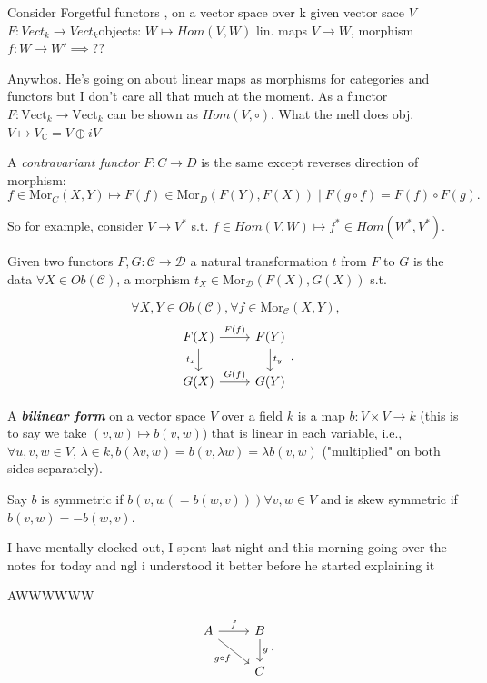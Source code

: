 \documentclass{report}
\begin{document}
Consider Forgetful functors , on a vector space over k given vector sace \( V \) \( F: Vect_k \to Vect_k \)objects: \( W \mapsto Hom(V,W) \) lin. maps \( V \to  W \), morphism \( f: W \to  W'\implies?? \)

Anywhos. He's going on about linear maps as morphisms for categories and functors but I don't care all that much at the moment. As a functor \( F : \text{Vect}_k \to  \text{Vect}_k \) can be shown as \( Hom(V, \circ) \). What the mell does obj. \( V \mapsto V_{\mathbb{C}}=V\oplus iV\)

\begin{definition}
  A \textit{contravariant functor} \( F : C \to D \) is the same except reverses direction of morphism:
  \begin{displaymath}
    f \in  \text{Mor}_C(X,Y) \mapsto F(f) \in  \text{Mor}_D(F(Y),F(X)) \mid  F(g\circ f)=F(f) \circ F(g).
  \end{displaymath}
\end{definition}

So for example, consider \( V \to V^* \) s.t. \( f \in  Hom(V,W) \mapsto f^* \in  Hom(W^*,V^*) \). 

\begin{definition}
  Given two functors \( F,G : \mathscr{C} \to  \mathscr{D} \) a natural transformation \( t \) from \( F \) to \(G\) is the data \( \forall X \in  Ob(\mathscr{C}) \), a morphism \( t_X \in  \text{Mor}_{\mathscr{D}}(F(X),G(X)) \) s.t. 

 \[
 \forall  X, Y \in  Ob(\mathscr{C}), \forall f \in  \text{Mor}_{\mathscr{C}}(X,Y), \]
 \[
\begin{tikzcd}
F(X) \arrow{r}{F(f)} \arrow[swap]{d}{t_x} & F(Y) \arrow{d}{t_y} \\%
G(X) \arrow{r}{G(f)}& G(Y)
\end{tikzcd}
.\]
  
\end{definition}

\begin{definition}
  A \textbf{\textit{bilinear form}} on a vector space \( V \) over a field \( k \) is a map \( b:V \times V \to  k \) (this is to say we take \( (v,w)\mapsto b(v,w) \)) that is linear in each variable, i.e., \( \forall u,v,w \in  V, \, \lambda \in  k, b(\lambda v,w)=b(v,\lambda w)=\lambda b(v,w) \) ("multiplied" on both sides separately). 
\end{definition}

\begin{definition}[symmetric]
  Say \( b \) is symmetric if \( b(v,w( = b(w,v) )) \forall v,w \in  V \) and is skew symmetric if \( b(v,w)=-b(w,v) \).
\end{definition}

I have mentally clocked out, I spent last night and this morning going over the notes for today and ngl i understood it better before he started explaining it 

AWWWWWW 

\[
  \begin{tikzcd}
    A \arrow{r}{f} \arrow[swap]{dr}{g\circ f} & B \arrow{d}{g} \\%
& C
\end{tikzcd}
.\] 
\end{document}
